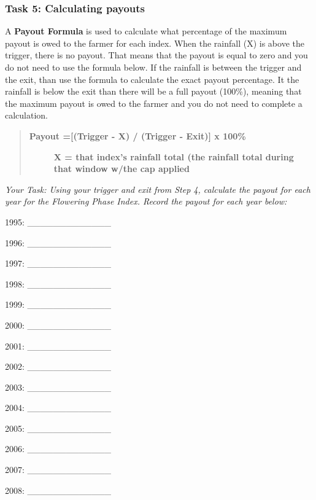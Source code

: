 \documentclass[letterpaper,10pt,english]{sphinxmanual}
\begin{document}
\subsubsection{Task 5: Calculating payouts}
\label{whatisindexinsurance/designingindexbyhand:task-5-calculating-payouts}
A \textbf{Payout Formula} is used to calculate what percentage of the maximum payout is owed to the farmer for each index. When the rainfall (X) is above the trigger, there is no payout. That means that the payout is equal to zero and you do not need to use the formula below. If the rainfall is between the trigger and the exit, than use the formula to calculate the exact payout percentage. It the rainfall is below the exit than there will be a full payout (100\%), meaning that the maximum payout is owed to the farmer and you do not need to complete a calculation.
\begin{quote}
\begin{description}
\item[{\textbf{Payout ={[}(Trigger - X) / (Trigger - Exit){]} x 100\%}}] \leavevmode
\textbf{X = that index's rainfall total (the rainfall total during that window w/the cap applied}

\end{description}
\end{quote}

\emph{Your Task: Using your trigger and exit from Step 4, calculate the payout for each year for the Flowering Phase Index. Record the payout for each year below:}

1995: \_\_\_\_\_\_\_\_\_\_\_\_\_

1996: \_\_\_\_\_\_\_\_\_\_\_\_\_

1997: \_\_\_\_\_\_\_\_\_\_\_\_\_

1998: \_\_\_\_\_\_\_\_\_\_\_\_\_

1999: \_\_\_\_\_\_\_\_\_\_\_\_\_

2000: \_\_\_\_\_\_\_\_\_\_\_\_\_

2001: \_\_\_\_\_\_\_\_\_\_\_\_\_

2002: \_\_\_\_\_\_\_\_\_\_\_\_\_

2003: \_\_\_\_\_\_\_\_\_\_\_\_\_

2004: \_\_\_\_\_\_\_\_\_\_\_\_\_

2005: \_\_\_\_\_\_\_\_\_\_\_\_\_

2006: \_\_\_\_\_\_\_\_\_\_\_\_\_

2007: \_\_\_\_\_\_\_\_\_\_\_\_\_

2008: \_\_\_\_\_\_\_\_\_\_\_\_\_
\end{document}

